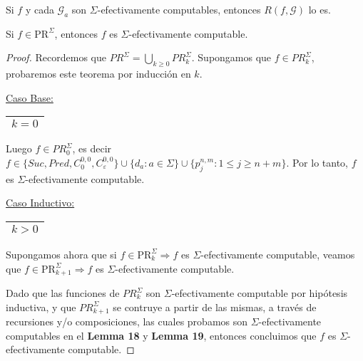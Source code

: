   \begin{lemma}
    \par Si $f$ y cada $\mathcal{G}_{a}$ son $\Sigma$-efectivamente computables, entonces $R(f, \mathcal{G})$ lo es.
  \end{lemma}

  \begin{theorem}
    \par Si $f \in \mathrm{PR}^{\Sigma}$, entonces $f$ es $\Sigma$-efectivamente computable.
  \end{theorem}
  \begin{proof}
    \par Recordemos que $PR^{\Sigma} = \bigcup\limits_{k \geq 0} PR_{k}^{\Sigma}$. Supongamos que $f \in
    PR_{k}^{\Sigma}$, probaremos este teorema por inducción en $k$.

    \vspace{3mm}
    \underline{Caso Base:} \begin{tabular}{|c|} \hline $k = 0$ \\\hline \end{tabular}

    \par Luego $f \in PR_{0}^{\Sigma}$, es decir $f \in \{Suc, Pred, C_{0}^{0,0}, C_{\varepsilon}^{0,0}\} \cup \{d_{a}:
    a \in \Sigma\} \cup \{p_{j}^{n,m} : 1 \leq j \geq n+m\}$. Por lo tanto, $f$ es $\Sigma$-efectivamente computable.

    \vspace{3mm}
		\underline{Caso Inductivo:} \begin{tabular}{|c|} \hline $k > 0$ \\\hline \end{tabular}

    \par Supongamos ahora que si $f \in \mathrm{PR}_{k}^{\Sigma} \Rightarrow f$ es
    $\Sigma$-efectivamente computable, veamos que $f \in \mathrm{PR}_{k+1}^{\Sigma} \Rightarrow f$ es
    $\Sigma$-efectivamente computable.

    \par Dado que las funciones de $PR_{k}^{\Sigma}$ son $\Sigma$-efectivamente computable por hipótesis inductiva, y
    que $PR_{k+1}^{\Sigma}$ se contruye a partir de las mismas, a través de recursiones y/o composiciones, las cuales
    probamos son $\Sigma$-efectivamente computables en el \textbf{Lemma 18} y \textbf{Lemma 19}, entonces concluimos que
    $f$ es $\Sigma$-efectivamente computable.
  \end{proof}

